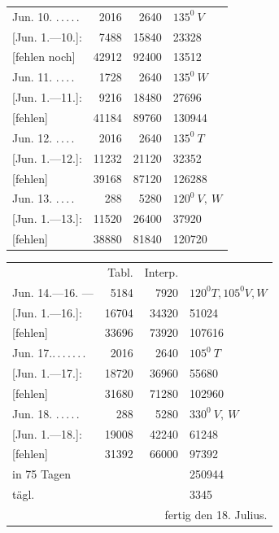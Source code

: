 \begin{center}
\begin{tabular}{@{}p{.36\linewidth}rrl@{}}
Jun. 10. \BJournalDay{☿}\nobreak\hspace{.2em}\mbox{.\,.\,.\,.\,.}\hfill&2016&2640&\(\mathit{135}^0\ V\)\\
\hfill [Jun. 1.—10.]:&7488&15840&23328\\
\hfill [fehlen noch]&42912&92400&13512\\
Jun. 11. \BJournalDay{♃}\nobreak\hspace{.2em}\mbox{.\,.\,.\,.}\hfill&1728&2640&\(\mathit{135}^0\ W\)\\
\hfill [Jun. 1.—11.]:&9216&18480&27696\\
\hfill [fehlen]&41184&89760&130944\\
Jun. 12. \BJournalDay{♀}\nobreak\hspace{.2em}\mbox{.\,.\,.\,.}\hfill&2016&2640&\(\mathit{135}^0\ T\)\\
\hfill [Jun. 1.—12.]:&11232&21120&32352\\
\hfill [fehlen]&39168&87120&126288\\
Jun. 13. \BJournalDay{♄}\nobreak\hspace{.2em}\mbox{.\,.\,.\,.}\hfill&288&5280&\(\mathit{120}^0\ V,\ W\)\\
\hfill [Jun. 1.—13.]:&11520&26400&37920\\
\hfill [fehlen]&38880&81840&120720
\end{tabular}
\end{center}
\begin{center}
\begin{tabular}{@{}p{.36\linewidth}rrl@{}}
&Tabl.&Interp.&\\
Jun. 14.—16. \BJournalDay{☉}—\BJournalDay{♂}&5184&7920&\(\mathit{120}^0 T,\mathit{105}^0 V,W\)\\
\hfill [Jun. 1.—16.]:&16704&34320&51024\\
\hfill [fehlen]&33696&73920&107616\\
Jun. 17.\nobreak\hspace{.2em}\mbox{.\,.\,.\,.\,.\,.\,.}\hfill&2016&2640&\(\mathit{105}^0\ T\)\\
\hfill [Jun. 1.—17.]:&18720&36960&55680\\
\hfill [fehlen]&31680&71280&102960\\
Jun. 18. \BJournalDay{♃}\nobreak\hspace{.2em}\mbox{.\,.\,.\,.\,.}\hfill&288&5280&\(\mathit{330}^0\ V,\ W\)\\
\hfill [Jun. 1.—18.]:&19008&42240&61248\\
\hfill [fehlen]&31392&66000&97392\\
\hfill in 75 Tagen&&&250944\\
\hfill tägl.&&&3345\\
\multicolumn{4}{r}{fertig den 18. Julius.}\\
\hline
\end{tabular}
\end{center}

